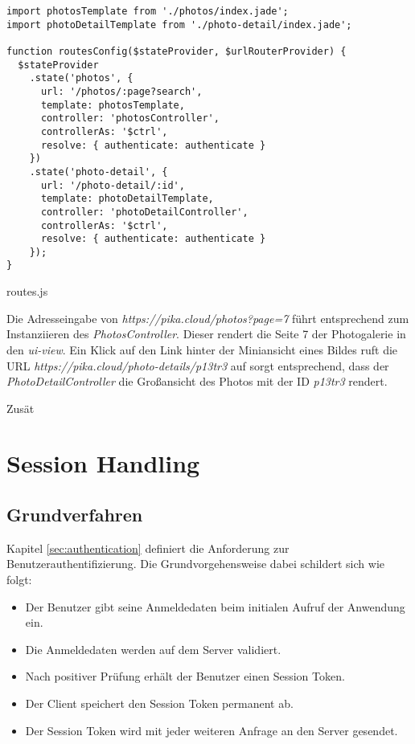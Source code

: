 \begin{listing}[H]
\begin{verbatim}
import photosTemplate from './photos/index.jade';
import photoDetailTemplate from './photo-detail/index.jade';

function routesConfig($stateProvider, $urlRouterProvider) {
  $stateProvider
    .state('photos', {
      url: '/photos/:page?search',
      template: photosTemplate,
      controller: 'photosController',
      controllerAs: '$ctrl',
      resolve: { authenticate: authenticate }
    })
    .state('photo-detail', {
      url: '/photo-detail/:id',
      template: photoDetailTemplate,
      controller: 'photoDetailController',
      controllerAs: '$ctrl',
      resolve: { authenticate: authenticate }
    });
}

\end{verbatim}
\caption{routes.js}
\label{lst:routing_config}
\end{listing}

Die Adresseingabe von \textit{https://pika.cloud/photos?page=7} führt entsprechend zum Instanziieren des \textit{PhotosController}. Dieser rendert die Seite 7 der Photogalerie in den \textit{ui-view}. Ein Klick auf den Link hinter der Miniansicht eines Bildes ruft die URL \textit{https://pika.cloud/photo-details/p13tr3} auf sorgt entsprechend, dass der \textit{PhotoDetailController} die Großansicht des Photos mit der ID  \textit{p13tr3} rendert. 

Zusät

\section{Session Handling}

\subsection{Grundverfahren}

Kapitel \ref{sec:authentication} definiert die Anforderung zur Benutzerauthentifizierung. Die Grundvorgehensweise dabei schildert sich wie folgt:

\begin{itemize}
  \item Der Benutzer gibt seine Anmeldedaten beim initialen Aufruf der Anwendung ein.
  \item Die Anmeldedaten werden auf dem Server validiert.
  \item Nach positiver Prüfung erhält der Benutzer einen Session Token.
  \item Der Client speichert den Session Token permanent ab.
  \item Der Session Token wird mit jeder weiteren Anfrage an den Server gesendet. 
\end{itemize}

